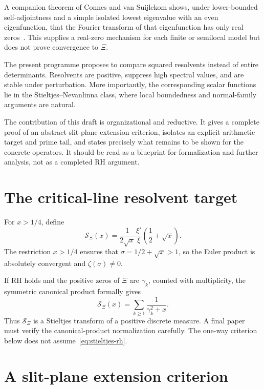 \documentclass[11pt]{article}
\theoremstyle{definition}
\newcommand{\XiR}{\mathcal S_{\Xi}}
\begin{document}
A companion theorem of Connes and van Suijlekom shows, under lower-bounded
self-adjointness and a simple isolated lowest eigenvalue with an even
eigenfunction, that the Fourier transform of that eigenfunction has only real
zeros~\cite{CvS2025}.  This supplies a real-zero mechanism for each finite or
semilocal model but does not prove convergence to $\Xi$.

The present programme proposes to compare squared resolvents instead of entire
determinants.  Resolvents are positive, suppress high spectral values, and are
stable under perturbation.  More importantly, the corresponding scalar
functions lie in the Stieltjes--Nevanlinna class, where local boundedness and
normal-family arguments are natural.

The contribution of this draft is organizational and reductive.  It gives a
complete proof of an abstract slit-plane extension criterion, isolates an
explicit arithmetic target and prime tail, and states precisely what remains to
be shown for the concrete operators.  It should be read as a blueprint for
formalization and further analysis, not as a completed RH argument.

\section{The critical-line resolvent target}

For $x>1/4$, define
\begin{equation}\label{eq:target}
\XiR(x)=\frac{1}{2\sqrt{x}}
\frac{\xi'}{\xi}\!\left(\frac12+\sqrt{x}\right).
\end{equation}
The restriction $x>1/4$ ensures that $\sigma=1/2+\sqrt{x}>1$, so the Euler
product is absolutely convergent and $\zeta(\sigma)\neq0$.

If RH holds and the positive zeros of $\Xi$ are $\gamma_k$, counted with
multiplicity, the symmetric canonical product formally gives
\begin{equation}\label{eq:stieltjes-rh}
\XiR(x)=\sum_{k\ge1}\frac1{\gamma_k^2+x}.
\end{equation}
Thus $\XiR$ is a Stieltjes transform of a positive discrete measure.  A final
paper must verify the canonical-product normalization carefully.  The
one-way criterion below does not assume~\eqref{eq:stieltjes-rh}.

\section{A slit-plane extension criterion}
\end{document}

